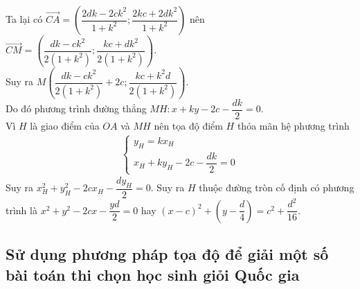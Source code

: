 \begin{bt}
{{
}
\noindent Ta lại có  $\overrightarrow{CA}=\left(\dfrac{2dk-2ck^2}{1+k^2};\dfrac{2kc+2dk^2}{1+k^2}\right)$ nên  $\overrightarrow{CM}=\left(\dfrac{dk-ck^2}{2(1+k^2)};\dfrac{kc+dk^2}{2(1+k^2)}\right)$. \\
		Suy ra $M\left(\dfrac{dk-ck^2}{2(1+k^2)}+2c;\dfrac{kc+k^2d}{2(1+k^2)}\right)$.\\ Do đó phương trình đường thẳng $MH: x+ky-2c-\dfrac{dk}{2}=0$. \\
		Vì $H$ là giao điểm của $OA$ và $MH$ nên tọa độ điểm $H$ thỏa mãn hệ phương trình 
		\begin{align*}
		\left\lbrace \begin{array}{l}
		y_H=kx_H \\
		x_H+ky_H-2c-\dfrac{dk}{2}=0
		\end{array} \right.
		\end{align*}
		Suy ra $x^2_H+y^2_H-2cx_H-\dfrac{dy_H}{2}=0 $. Suy ra $H$ thuộc đường tròn cố định có phương trình là $x^2+y^2-2cx-\dfrac{yd}{2}=0$ hay $(x-c)^2+\left(y-\dfrac{d}{4}\right)=c^2+\dfrac{d^2}{16}$.
	}
\end{bt}
\subsection{Sử dụng phương pháp tọa độ để giải một số bài toán thi chọn học sinh giỏi Quốc gia}


